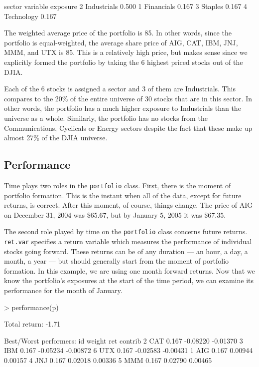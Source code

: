 \documentclass[a4paper]{report}
\begin{document}
\begin{article}
\begin{Schunk}
\begin{Soutput}
sector 
     variable exposure
2 Industrials    0.500
1  Financials    0.167
3     Staples    0.167
4  Technology    0.167
\end{Soutput}
\end{Schunk}

The weighted average price of the portfolio is 85. In other words,
since the portfolio is equal-weighted, the average share price of AIG,
CAT, IBM, JNJ, MMM, and UTX is 85. This is a relatively high price,
but makes sense since we explicitly formed the portfolio by taking the
6 highest priced stocks out of the DJIA.

Each of the 6 stocks is assigned a sector and 3 of them are
Industrials. This compares to the 20\% of the entire universe of 30
stocks that are in this sector. In other words, the portfolio has a
much higher exposure to Industrials than the universe as a whole.
Similarly, the portfolio has no stocks from the Communications,
Cyclicals or Energy sectors despite the fact that these make up almost
27\% of the DJIA universe. 

\subsection*{Performance}

Time plays two roles in the \texttt{portfolio} class. First, there is
the moment of portfolio formation. This is the instant when all of the
data, except for future returns, is correct. After this moment, of
course, things change. The price of AIG on December 31, 2004 was
\$65.67, but by January 5, 2005 it was \$67.35.

The second role played by time on the \texttt{portfolio} class
concerns future returns. \texttt{ret.var} specifies a return variable
which measures the performance of individual stocks going forward.
These returns can be of any duration --- an hour, a day, a month, a
year --- but should generally start from the moment of portfolio
formation. In this example, we are using one month forward returns.
Now that we know the portfolio's exposures at the start of the time
period, we can examine its performance for the month of January.

\begin{Schunk}
\begin{Sinput}
> performance(p)
\end{Sinput}
\begin{Soutput}
Total return:  -1.71 %

Best/Worst performers:
   id weight      ret  contrib
2 CAT  0.167 -0.08220 -0.01370
3 IBM  0.167 -0.05234 -0.00872
6 UTX  0.167 -0.02583 -0.00431
1 AIG  0.167  0.00944  0.00157
4 JNJ  0.167  0.02018  0.00336
5 MMM  0.167  0.02790  0.00465
\end{Soutput}
\end{Schunk}


\end{article}
\end{document}
